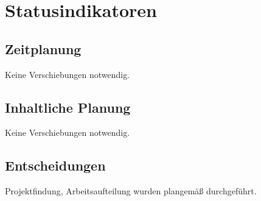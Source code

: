 \section{Statusindikatoren}

\subsection{Zeitplanung}
Keine Verschiebungen notwendig.

\subsection{Inhaltliche Planung}
Keine Verschiebungen notwendig.

\subsection{Entscheidungen}
Projektfindung, Arbeitsaufteilung wurden plangemäß durchgeführt.


